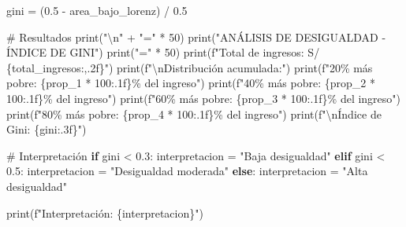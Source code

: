 \documentclass[
  doc,
  floatsintext,
  longtable,
  a4paper,
  nolmodern,
  notxfonts,
  notimes,
  12pt,
  colorlinks=true,linkcolor=blue,citecolor=blue,urlcolor=blue]{apa7}
\newenvironment{Shaded}{\begin{snugshade}}{\end{snugshade}}
\newcommand{\BuiltInTok}[1]{\textcolor[rgb]{0.00,0.23,0.31}{#1}}
\newcommand{\CharTok}[1]{\textcolor[rgb]{0.13,0.47,0.30}{#1}}
\newcommand{\CommentTok}[1]{\textcolor[rgb]{0.37,0.37,0.37}{#1}}
\newcommand{\ControlFlowTok}[1]{\textcolor[rgb]{0.00,0.23,0.31}{\textbf{#1}}}
\newcommand{\DecValTok}[1]{\textcolor[rgb]{0.68,0.00,0.00}{#1}}
\newcommand{\FloatTok}[1]{\textcolor[rgb]{0.68,0.00,0.00}{#1}}
\newcommand{\NormalTok}[1]{\textcolor[rgb]{0.00,0.23,0.31}{#1}}
\newcommand{\OperatorTok}[1]{\textcolor[rgb]{0.37,0.37,0.37}{#1}}
\newcommand{\SpecialCharTok}[1]{\textcolor[rgb]{0.37,0.37,0.37}{#1}}
\newcommand{\SpecialStringTok}[1]{\textcolor[rgb]{0.13,0.47,0.30}{#1}}
\newcommand{\StringTok}[1]{\textcolor[rgb]{0.13,0.47,0.30}{#1}}
\begin{document}
\begin{Shaded}
\begin{Highlighting}[]
\NormalTok{gini }\OperatorTok{=}\NormalTok{ (}\FloatTok{0.5} \OperatorTok{{-}}\NormalTok{ area\_bajo\_lorenz) }\OperatorTok{/} \FloatTok{0.5}

\CommentTok{\# Resultados}
\BuiltInTok{print}\NormalTok{(}\StringTok{"}\CharTok{\textbackslash{}n}\StringTok{"} \OperatorTok{+} \StringTok{"="} \OperatorTok{*} \DecValTok{50}\NormalTok{)}
\BuiltInTok{print}\NormalTok{(}\StringTok{"ANÁLISIS DE DESIGUALDAD {-} ÍNDICE DE GINI"}\NormalTok{)}
\BuiltInTok{print}\NormalTok{(}\StringTok{"="} \OperatorTok{*} \DecValTok{50}\NormalTok{)}
\BuiltInTok{print}\NormalTok{(}\SpecialStringTok{f"Total de ingresos: S/ }\SpecialCharTok{\{}\NormalTok{total\_ingresos}\SpecialCharTok{:,.2f\}}\SpecialStringTok{"}\NormalTok{)}
\BuiltInTok{print}\NormalTok{(}\SpecialStringTok{f"}\CharTok{\textbackslash{}n}\SpecialStringTok{Distribución acumulada:"}\NormalTok{)}
\BuiltInTok{print}\NormalTok{(}\SpecialStringTok{f"20\% más pobre:  }\SpecialCharTok{\{}\NormalTok{prop\_1 }\OperatorTok{*} \DecValTok{100}\SpecialCharTok{:.1f\}}\SpecialStringTok{\% del ingreso"}\NormalTok{)}
\BuiltInTok{print}\NormalTok{(}\SpecialStringTok{f"40\% más pobre:  }\SpecialCharTok{\{}\NormalTok{prop\_2 }\OperatorTok{*} \DecValTok{100}\SpecialCharTok{:.1f\}}\SpecialStringTok{\% del ingreso"}\NormalTok{)}
\BuiltInTok{print}\NormalTok{(}\SpecialStringTok{f"60\% más pobre:  }\SpecialCharTok{\{}\NormalTok{prop\_3 }\OperatorTok{*} \DecValTok{100}\SpecialCharTok{:.1f\}}\SpecialStringTok{\% del ingreso"}\NormalTok{)}
\BuiltInTok{print}\NormalTok{(}\SpecialStringTok{f"80\% más pobre:  }\SpecialCharTok{\{}\NormalTok{prop\_4 }\OperatorTok{*} \DecValTok{100}\SpecialCharTok{:.1f\}}\SpecialStringTok{\% del ingreso"}\NormalTok{)}
\BuiltInTok{print}\NormalTok{(}\SpecialStringTok{f"}\CharTok{\textbackslash{}n}\SpecialStringTok{Índice de Gini: }\SpecialCharTok{\{}\NormalTok{gini}\SpecialCharTok{:.3f\}}\SpecialStringTok{"}\NormalTok{)}

\CommentTok{\# Interpretación}
\ControlFlowTok{if}\NormalTok{ gini }\OperatorTok{\textless{}} \FloatTok{0.3}\NormalTok{:}
\NormalTok{    interpretacion }\OperatorTok{=} \StringTok{"Baja desigualdad"}
\ControlFlowTok{elif}\NormalTok{ gini }\OperatorTok{\textless{}} \FloatTok{0.5}\NormalTok{:}
\NormalTok{    interpretacion }\OperatorTok{=} \StringTok{"Desigualdad moderada"}
\ControlFlowTok{else}\NormalTok{:}
\NormalTok{    interpretacion }\OperatorTok{=} \StringTok{"Alta desigualdad"}

\BuiltInTok{print}\NormalTok{(}\SpecialStringTok{f"Interpretación: }\SpecialCharTok{\{}\NormalTok{interpretacion}\SpecialCharTok{\}}\SpecialStringTok{"}\NormalTok{)}
\end{Highlighting}
\end{Shaded}
\end{document}

